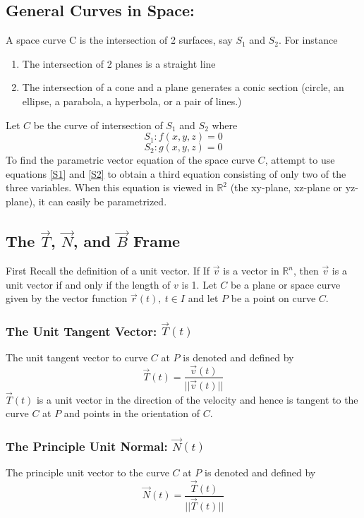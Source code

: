 \documentclass[14pt]{article}
\begin{document}
    \subsection{General Curves in Space:}
    A space curve C is the intersection of 2 surfaces, say $S_1$ and $S_2$. For instance
    \begin{enumerate}
        \item The intersection of 2 planes is a straight line
        \item The intersection of a cone and a plane generates a conic section (circle, an ellipse, a parabola, a hyperbola, or a pair of lines.)
    \end{enumerate}
    Let $C$ be the curve of intersection of $S_1$ and $S_2$ where
    \begin{equation}\label{S1}
        S_1:f(x,y,z)=0
    \end{equation}
    \begin{equation}\label{S2}
        S_2:g(x,y,z)=0
    \end{equation}
    To find the parametric vector equation of the space curve $C$, attempt to use equations \eqref{S1} and \eqref{S2} to obtain a third equation consisting of only two of the three variables. When this equation is viewed in $\mathbb{R}^2$ (the xy-plane, xz-plane or yz-plane), it can easily be parametrized.
    \subsection{The $\vec T$, $\vec N$, and $\vec B$ Frame}
    First Recall the definition of a unit vector. If If $\vec v$ is a vector in $\mathbb{R}^n$, then $\vec v$ is a unit vector if and only if the length of $v$ is 1. Let $C$ be a plane or space curve given by the vector function $\vec r(t),\ t\in I$ and let $P$ be a point on curve $C$.
    \subsubsection{The Unit Tangent Vector: $\vec T(t)$}
    The unit tangent vector to curve $C$ at $P$ is denoted and defined by
    $$\vec T(t)=\frac{\vec v(t)}{||\vec v (t)||}$$
    $\vec T(t)$ is a unit vector in the direction of the velocity and hence is tangent to the curve $C$ at $P$ and points in the orientation of $C$.
    \subsubsection{The Principle Unit Normal: $\vec N(t)$}
    The principle unit vector to the curve $C$ at $P$ is denoted and defined by
    $$\vec N(t)=\frac{\vec T(t)}{||\vec T(t)||}$$
\end{document}
